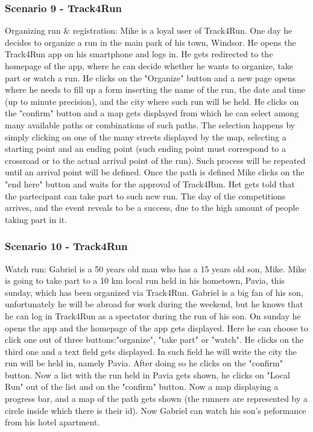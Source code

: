{\color{secblue}\subsubsection{Scenario 9 - Track4Run}}
Organizing run \& registration:
Mike is a loyal user of Track4Run.
One day he decides to organize a run in the main park of his town, Windsor. 
He opens the Track4Run app on his smartphone and logs in.
He gets redirected to the homepage of the app, where he can decide whether he wants to organize, take part or watch a run.
He clicks on the "Organize" button and a new page opens where he needs to fill up a form inserting the name of the run, the date and time (up to minute precision), and the city where such run will be held.
He clicks on the "confirm" button and a map gets displayed from which he can select among many available paths or combinations of such paths.
The selection happens by simply clicking on one of the many streets displayed by the map, selecting a starting point and an ending point (such ending point must correspond to a crossroad or to the actual arrival point of the run).
Such process will be repeated until an arrival point will be defined.
Once the path is defined Mike clicks on the "end here" button and waits for the approval of Track4Run.
Het gets told that the partecipant can take part to such new run.
The day of the competitions arrives, and the event reveals to be a success, due to the high amount of people taking part in it.

{\color{secblue}\subsubsection{Scenario 10 - Track4Run}}
Watch run:
Gabriel is a 50 years old man who has a 15 years old son, Mike.
Mike is going to take part to a 10 km local run held in his hometown, Pavia, this sunday, which has been organized via Track4Run.
Gabriel is a big fan of his son, unfortunately he will be abroad for work during the weekend, but he knows that he can log in Track4Run as a spectator during the run of his son.
On sunday he opens the app and the homepage of the app gets displayed. Here he can choose to click one out of three buttons:"organize", "take part" or "watch".
He clicks on the third one and a text field gets displayed. In such field he will write the city the run will be held in, namely Pavia.
After doing so he clicks on the "confirm" button.
Now a list with the run held in Pavia gets shown, he clicks on "Local Run" out of the list and on the "confirm" button.
Now a map displaying a progress bar, and a map of the path gets shown (the runners are represented by a circle inside which there is their id). 
Now Gabriel can watch his son's peformance from his hotel apartment.

